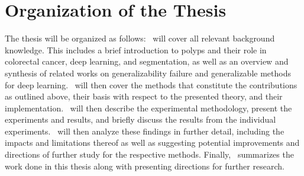     
    \section{Organization of the Thesis}
    The thesis will be organized as follows:~ will cover all relevant background knowledge. This includes a brief introduction to polyps and their role in colorectal cancer, deep learning, and segmentation, as well as an overview and synthesis of related works on generalizability failure and generalizable methods for deep learning.~ will then cover the methods that constitute the contributions as outlined above, their basis with respect to the presented theory, and their implementation.~ will then describe the experimental methodology, present the experiments and results, and briefly discuss the results from the individual experiments.~ will then analyze these findings in further detail, including the impacts and limitations thereof as well as suggesting potential improvements and directions of further study for the respective methods. Finally,~ summarizes the work done in this thesis along with presenting directions for further research.
